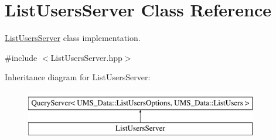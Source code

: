\hypertarget{classListUsersServer}{
\section{ListUsersServer Class Reference}
\label{classListUsersServer}
}


\hyperlink{classListUsersServer}{ListUsersServer} class implementation.  




{\ttfamily \#include $<$ListUsersServer.hpp$>$}

Inheritance diagram for ListUsersServer:\begin{figure}[H]
\begin{center}
\leavevmode
\includegraphics[height=2.000000cm]{classListUsersServer}
\end{center}
\end{figure}
